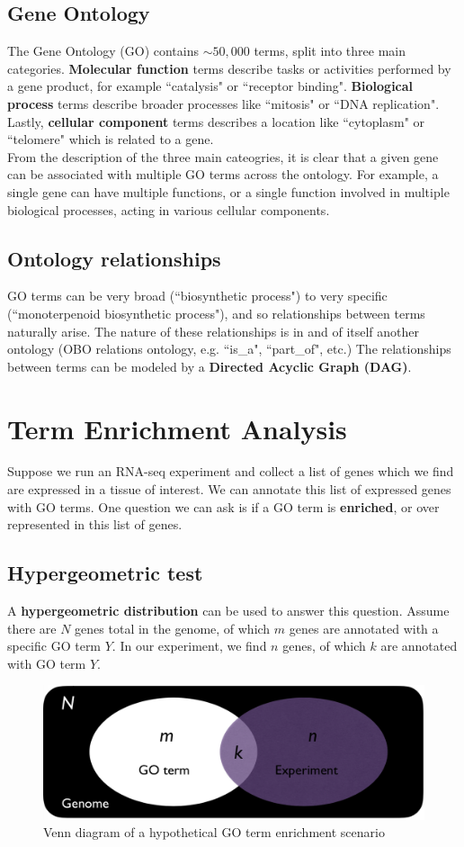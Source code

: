 \documentclass[12pt]{article}
\begin{document}
\subsection{Gene Ontology}
The Gene Ontology (GO) contains $\sim50,000$ terms, split into three main categories. \textbf{Molecular function} terms describe tasks or activities performed by a gene product, for example ``catalysis" or ``receptor binding". \textbf{Biological process} terms describe broader processes like ``mitosis" or ``DNA replication". Lastly, \textbf{cellular component} terms describes a location like ``cytoplasm" or ``telomere" which is related to a gene.\\[10pt]
From the description of the three main cateogries, it is clear that a given gene can be associated with multiple GO terms across the ontology. For example, a single gene can have multiple functions, or a single function involved in multiple biological processes, acting in various cellular components.
\subsection{Ontology relationships}
GO terms can be very broad (``biosynthetic process") to very specific (``monoterpenoid biosynthetic process"), and so relationships between terms naturally arise. The nature of these relationships is in and of itself another ontology (OBO relations ontology, e.g. ``is\_a", ``part\_of", etc.) The relationships between terms can be modeled by a \textbf{Directed Acyclic Graph (DAG)}.

\section{Term Enrichment Analysis}
Suppose we run an RNA-seq experiment and collect a list of genes which we find are expressed in a tissue of interest. We can annotate this list of expressed genes with GO terms. One question we can ask is if a GO term is \textbf{enriched}, or over represented in this list of genes.

\subsection{Hypergeometric test}
A \textbf{hypergeometric distribution} can be used to answer this question. Assume there are $N$ genes total in the genome, of which $m$ genes are annotated with a specific GO term $Y$. In our experiment, we find $n$ genes, of which $k$ are annotated with GO term $Y$. 
\begin{figure}[h!]
    \centering
    \includegraphics[width = .6\linewidth]{enrich.png}
    \caption{Venn diagram of a hypothetical GO term enrichment scenario}
    \label{fig:my_label}
\end{figure}
\end{document}
